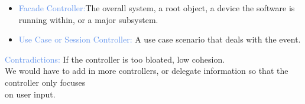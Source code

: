 \documentclass[a4paper,10pt]{article}
\begin{document}
\renewcommand{\labelitemi}{\textperiodcentered}
\begin{itemize}
\item \textcolor{CornflowerBlue}{Facade Controller:}The overall system, a root object, a device the software is running within, or a major subsystem.
\item \textcolor{CornflowerBlue}{Use Case or Session Controller:} A use case scenario that deals with the event.
\end{itemize}
\indent \indent \textcolor{CornflowerBlue}{Contradictions:} If the controller is too bloated, low cohesion. \\
\indent We would have to add in more controllers, or delegate information so that the controller only focuses \\
\indent on user input.

\newpage
\end{document}
